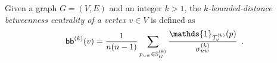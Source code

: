 \begin{definition}\label{def:kboundbetweenness}
  \citep{BorgattiE06,Brandes08} Given a graph $G=(V,E)$ and an integer $k>1$,
  the \emph{$k$-bounded-distance betweenness centrality of a vertex $v\in V$} is
  defined as
  \[
  \kboundbetw^{(k)}(v)=\frac{1}{n(n-1)}\sum_{p_{uw}\in\mathbb{S}^{(k)}_G}\frac{\mathds{1}_{\mathcal{T}^{(k)}_v}(p)}{\sigma^{(k)}_{uw}}
  \enspace.
  \]
\end{definition}

%
%

